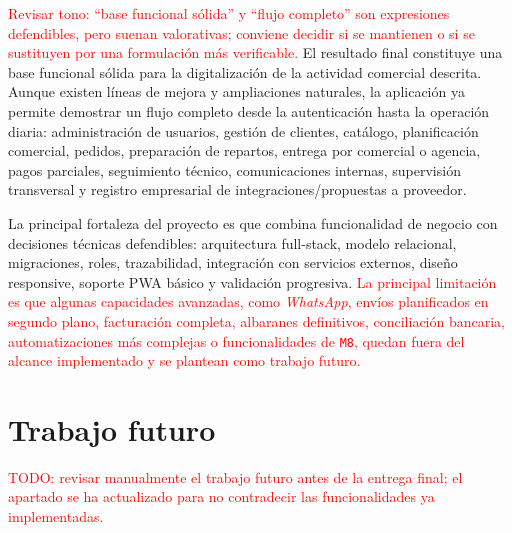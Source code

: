 \textcolor{red}{Revisar tono: ``base funcional sólida'' y ``flujo completo'' son expresiones defendibles, pero suenan valorativas; conviene decidir si se mantienen o si se sustituyen por una formulación más verificable.} El resultado final constituye una base funcional sólida para la digitalización de la actividad comercial descrita. Aunque existen líneas de mejora y ampliaciones naturales, la aplicación ya permite demostrar un flujo completo desde la autenticación hasta la operación diaria: administración de usuarios, gestión de clientes, catálogo, planificación comercial, pedidos, preparación de repartos, entrega por comercial o agencia, pagos parciales, seguimiento técnico, comunicaciones internas, supervisión transversal y registro empresarial de integraciones/propuestas a proveedor.

La principal fortaleza del proyecto es que combina funcionalidad de negocio con decisiones técnicas defendibles: arquitectura full-stack, modelo relacional, migraciones, roles, trazabilidad, integración con servicios externos, diseño responsive, soporte PWA básico y validación progresiva. \textcolor{red}{La principal limitación es que algunas capacidades avanzadas, como \textit{WhatsApp}, envíos planificados en segundo plano, facturación completa, albaranes definitivos, conciliación bancaria, automatizaciones más complejas o funcionalidades de \texttt{M8}, quedan fuera del alcance implementado y se plantean como trabajo futuro.}

\section{Trabajo futuro}
\label{sec:futurework}
\textcolor{red}{TODO: revisar manualmente el trabajo futuro antes de la entrega final; el apartado se ha actualizado para no contradecir las funcionalidades ya implementadas.}

